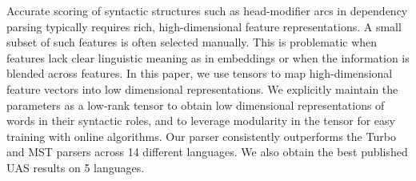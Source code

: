 Accurate scoring of syntactic structures such as head-modifier arcs in dependency parsing typically requires rich, high-dimensional feature representations. A small subset of such features is often selected manually. This is problematic when features lack clear linguistic meaning as in embeddings or when the information is blended across features. In this paper, we use tensors to map high-dimensional feature vectors into low dimensional representations. We explicitly maintain the parameters as a low-rank tensor to obtain low dimensional representations of words in their syntactic roles, and to leverage modularity in the tensor for easy training with online algorithms. Our parser consistently outperforms the Turbo and MST parsers across 14 different languages. We also obtain the best published UAS results on 5 languages.
